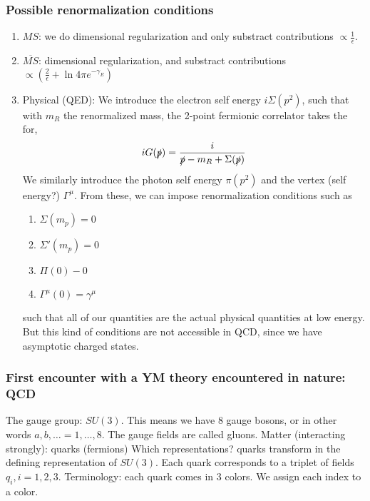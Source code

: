 \documentclass[a4paper]{book}
\theoremstyle{definition}
\theoremstyle{remark}
\begin{document}
\subsubsection{Possible renormalization conditions}
\begin{enumerate}
    \item $MS$: we do dimensional regularization and only substract contributions $\propto \frac{1}{\epsilon}$. 
    \item $\overline{MS}$: dimensional regularization, and substract contributions $\propto (\frac{2}{\epsilon} + \ln 4\pi e^{-\gamma_E})$
    \item Physical (QED): We introduce the electron self energy $i\Sigma(p^2)$, such that with $m_R$ the renormalized mass, the 2-point fermionic correlator takes the for, 
    \begin{equation}
        iG(\slashed{p}) = \frac{i}{\slashed{p} - m_R + \Sigma(\slashed{p})}
    \end{equation}
    We similarly introduce the photon self energy $\pi(p^2)$ and the vertex (self energy?) $\Gamma^\mu$. From these, we can impose renormalization conditions such as 
    \begin{enumerate}
        \item $\Sigma(m_p) = 0$
        \item $\Sigma'(m_p) = 0$
        \item $\Pi(0) - 0$
        \item $\Gamma^\mu(0) = \gamma^\mu$
    \end{enumerate}
    such that all of our quantities are the actual physical quantities at low energy. But this kind of conditions are not accessible in QCD, since we have asymptotic charged states. 
\end{enumerate}

\subsubsection{First encounter with a YM theory encountered in nature: QCD}
The gauge group: $SU(3)$. This means we have 8 gauge bosons, or in other words $a,b,\dots = 1,\dots, 8$. The gauge fields are called gluons. \newline
Matter (interacting strongly): quarks (fermions) \newline 
Which representations? quarks transform in the defining representation of $SU(3)$. Each quark corresponds to a triplet of fields $q_i, i = 1, 2, 3$. Terminology: each quark comes in 3 colors. We assign each index to a color. \newline 
\end{document}
